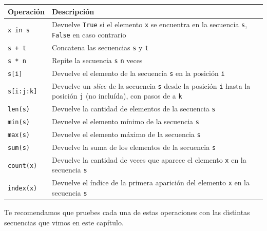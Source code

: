 \documentclass[
  letterpaper,
  DIV=11,
  numbers=noendperiod]{scrreprt}
\begin{document}
\begin{longtable}[]{@{}
  >{\raggedright\arraybackslash}p{}
  >{\raggedright\arraybackslash}p{}@{}}
\toprule\noalign{}
\begin{minipage}[b]{\linewidth}\raggedright
Operación
\end{minipage} & \begin{minipage}[b]{\linewidth}\raggedright
Descripción
\end{minipage} \\
\midrule\noalign{}
\endhead
\bottomrule\noalign{}
\endlastfoot
\texttt{x\ in\ s} & Devuelve \texttt{True} si el elemento \texttt{x} se
encuentra en la secuencia \texttt{s}, \texttt{False} en caso
contrario~ \\
\texttt{s\ +\ t} & Concatena las secuencias \texttt{s} y \texttt{t} \\
\texttt{s\ *\ n} & Repite la secuencia \texttt{s} \texttt{n} veces \\
\texttt{s{[}i{]}} & Devuelve el elemento de la secuencia \texttt{s} en
la posición \texttt{i} \\
\texttt{s{[}i:j:k{]}} & Devuelve un \emph{slice} de la secuencia
\texttt{s} desde la posición \texttt{i} hasta la posición \texttt{j} (no
incluída), con pasos de a \texttt{k} \\
\texttt{len(s)} & Devuelve la cantidad de elementos de la secuencia
\texttt{s} \\
\texttt{min(s)} & Devuelve el elemento mínimo de la secuencia
\texttt{s} \\
\texttt{max(s)} & Devuelve el elemento máximo de la secuencia
\texttt{s} \\
\texttt{sum(s)} & Devuelve la suma de los elementos de la secuencia
\texttt{s} \\
\texttt{count(x)} & Devuelve la cantidad de veces que aparece el
elemento \texttt{x} en la secuencia \texttt{s} \\
\texttt{index(x)} & Devuelve el índice de la primera aparición del
elemento \texttt{x} en la secuencia \texttt{s} \\
\end{longtable}

\begin{tcolorbox}[enhanced jigsaw, arc=.35mm, toptitle=1mm, colframe=quarto-callout-tip-color-frame, bottomtitle=1mm, opacitybacktitle=0.6, colbacktitle=quarto-callout-tip-color!10!white, leftrule=.75mm, coltitle=black, toprule=.15mm, titlerule=0mm, title=\textcolor{quarto-callout-tip-color}{\faLightbulb}\hspace{0.5em}{Tip}, bottomrule=.15mm, rightrule=.15mm, colback=white, breakable, opacityback=0, left=2mm]

Te recomendamos que pruebes cada una de estas operaciones con las
distintas secuencias que vimos en este capítulo.

\end{tcolorbox}
\end{document}
